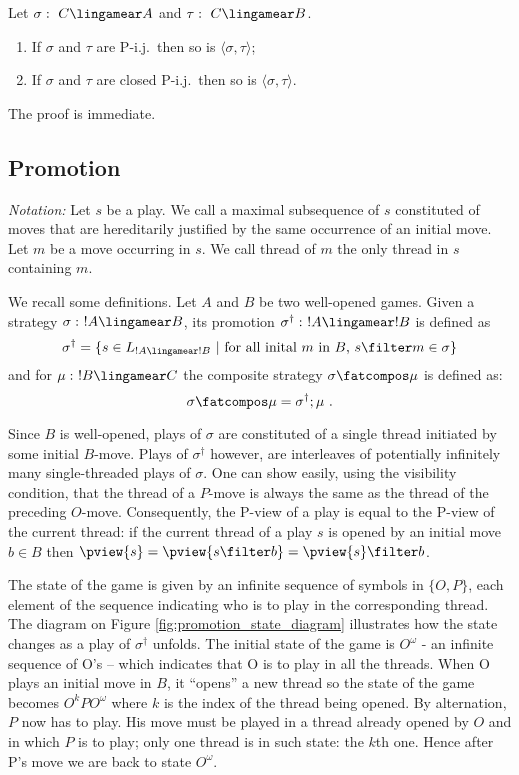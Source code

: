 \begin{proposition}
\label{prop:pij_paring} Let $\sigma :\ C \lingamear A$  and $\tau :\
C\lingamear B$.
\begin{enumerate}
\item If $\sigma$ and $\tau$ are P-i.j.\ then so is $\langle \sigma , \tau \rangle$;
\item If $\sigma$ and $\tau$ are closed P-i.j.\ then so is $\langle \sigma , \tau \rangle$.
\end{enumerate}
\end{proposition}
The proof is immediate.


\subsection{Promotion} \emph{Notation:} Let $s$ be a play. We call
\defname{thread} a maximal subsequence of $s$ constituted of moves
that are hereditarily justified by the same occurrence of an initial
move. Let $m$ be a move occurring in $s$. We call thread of $m$ the
only thread in $s$ containing $m$.


We recall some definitions. Let $A$ and $B$ be two well-opened
games. Given a strategy  $\sigma :\ !A \lingamear B$, its promotion
$\sigma^\dag :\ !A\lingamear !B$ is defined as
$$ \sigma^\dag = \{ s \in L_{!A\lingamear !B}\ |\ \mbox{for all inital $m$ in $B$, } s\filter m \in \sigma \}$$
and for $\mu :\ !B\lingamear C$ the composite strategy $\sigma
\fatcompos \mu$ is defined as:
$$ \sigma \fatcompos \mu = \sigma^\dag ; \mu \ .$$

Since $B$ is well-opened, plays of $\sigma$ are constituted of a
single thread initiated by some initial $B$-move. Plays of
$\sigma^\dag$ however, are interleaves of potentially infinitely many single-threaded
plays of $\sigma$. One can show easily, using the visibility condition, that the thread of a $P$-move
is always the same as the thread of the preceding $O$-move. Consequently, the P-view of a play is equal to the P-view of the current thread:
if the current thread of a play $s$ is opened by an initial move $b \in B$ then
$\pview{s} = \pview{s \filter b} = \pview{s} \filter b$.


The state of the game is given by an infinite sequence of symbols in $\{O, P\}$, each element of the
sequence indicating who is to play in the corresponding thread.
The diagram on Figure \ref{fig:promotion_state_diagram} illustrates
how the state changes as a play of $\sigma^\dag$ unfolds.
The initial state of the game is $O^\omega$ - an infinite
sequence of O's -- which indicates that O is to play in all the
threads. When O plays an initial move in $B$, it ``opens'' a new
thread so the state of the game becomes $O^k P O^\omega$ where $k$
is the index of the thread being opened. By alternation, $P$ now has to play. His move must be played in a thread
already opened by $O$ and in which $P$ is to play; only one thread is in such state: the $k$th one. Hence after P's move
we are back to state $O^\omega$.

